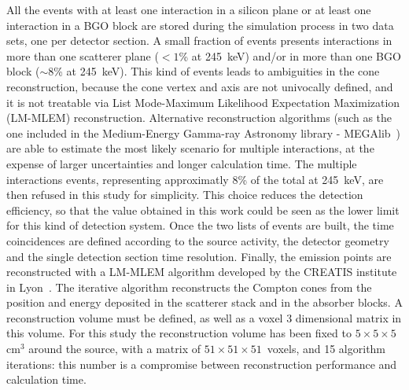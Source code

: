 All the events with at least one interaction in a silicon plane or at least one interaction in a BGO block are stored during the simulation process in two data sets, one per detector section. A small fraction of events presents interactions in more than one scatterer plane ($<1$\% at 245~keV) and/or in more than one BGO block ($\sim$8\% at 245~keV). This kind of events leads to ambiguities in the cone reconstruction, because the cone vertex and axis are not univocally defined, and it is not treatable via List Mode-Maximum Likelihood Expectation Maximization (LM-MLEM) reconstruction. Alternative reconstruction algorithms (such as the one included in the Medium-Energy Gamma-ray Astronomy library -
MEGAlib~\cite{MEGALIB}) are able to estimate the most likely scenario for multiple interactions, at the expense of larger uncertainties and longer calculation time. The multiple interactions events, representing approximatly 8\% of the total at 245~keV, are then refused in this study for simplicity. This choice reduces the detection efficiency, so that the value obtained in this work could be seen as the lower limit for this kind of detection system. Once the two lists of events are built, the time coincidences are defined according to the source activity, the detector geometry and the single detection section time resolution. Finally, the emission points are reconstructed with a LM-MLEM algorithm developed by the CREATIS institute in Lyon~\cite{MLEM_Lojacono}. The iterative algorithm reconstructs the Compton cones from the position and energy deposited in the scatterer stack and in the absorber blocks. A reconstruction volume must be defined, as well as a voxel 3 dimensional matrix in this volume. For this study the reconstruction volume has been fixed to $\mathrm{5\times5\times5}$~$\mathrm{cm^{3}}$ around the source, with a matrix of $\mathrm{51\times51\times51}$~voxels, and 15 algorithm iterations: this number is a compromise between reconstruction performance and calculation time.

